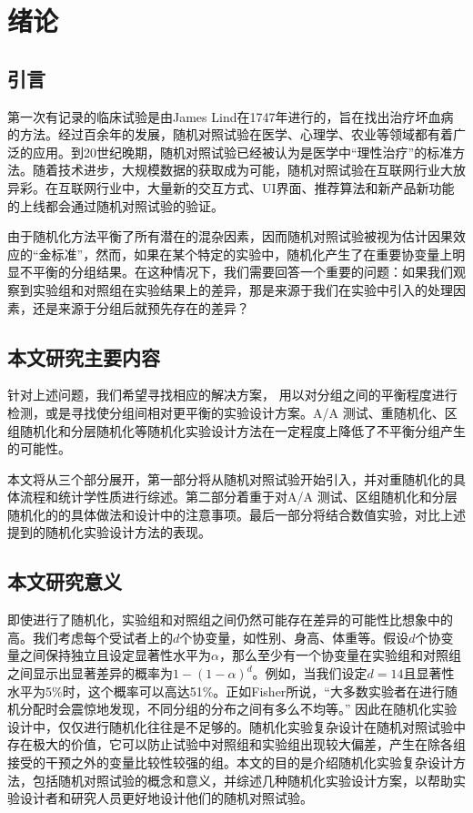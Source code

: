 
\chapter{绪论}

\section{引言}

第一次有记录的临床试验是由James Lind在1747年进行的，旨在找出治疗坏血病的方法\cite{dunn1997james}。经过百余年的发展，随机对照试验在医学、心理学、农业等领域都有着广泛的应用。到20世纪晚期，随机对照试验已经被认为是医学中“理性治疗”的标准方法\cite{meldrum2000brief}。随着技术进步，大规模数据的获取成为可能，随机对照试验在互联网行业大放异彩。在互联网行业中，大量新的交互方式、UI界面、推荐算法和新产品新功能的上线都会通过随机对照试验的验证。

由于随机化方法平衡了所有潜在的混杂因素，因而随机对照试验被视为估计因果效应的“金标准”，然而，如果在某个特定的实验中，随机化产生了在重要协变量上明显不平衡的分组结果。在这种情况下，我们需要回答一个重要的问题：如果我们观察到实验组和对照组在实验结果上的差异，那是来源于我们在实验中引入的处理因素，还是来源于分组后就预先存在的差异？

\section{本文研究主要内容}

针对上述问题，我们希望寻找相应的解决方案， 用以对分组之间的平衡程度进行检测，或是寻找使分组间相对更平衡的实验设计方案。A/A 测试、重随机化、区组随机化和分层随机化等随机化实验设计方法在一定程度上降低了不平衡分组产生的可能性。

本文将从三个部分展开，第一部分将从随机对照试验开始引入，并对重随机化的具体流程和统计学性质进行综述。第二部分着重于对A/A 测试、区组随机化和分层随机化的的具体做法和设计中的注意事项。最后一部分将结合数值实验，对比上述提到的随机化实验设计方法的表现。

\section{本文研究意义}

即使进行了随机化，实验组和对照组之间仍然可能存在差异的可能性比想象中的高。我们考虑每个受试者上的$d$个协变量，如性别、身高、体重等。假设$d$个协变量之间保持独立且设定显著性水平为$\alpha$，那么至少有一个协变量在实验组和对照组之间显示出显著差异的概率为$1-(1-\alpha)^d$。例如，当我们设定$d=14$且显著性水平为5\%时，这个概率可以高达51\%。正如Fisher所说，“大多数实验者在进行随机分配时会震惊地发现，不同分组的分布之间有多么不均等。”\cite{fisher1992arrangement}
因此在随机化实验设计中，仅仅进行随机化往往是不足够的。随机化实验复杂设计在随机对照试验中存在极大的价值，它可以防止试验中对照组和实验组出现较大偏差，产生在除各组接受的干预之外的变量比较性较强的组。本文的目的是介绍随机化实验复杂设计方法，包括随机对照试验的概念和意义，并综述几种随机化实验设计方案，以帮助实验设计者和研究人员更好地设计他们的随机对照试验。


